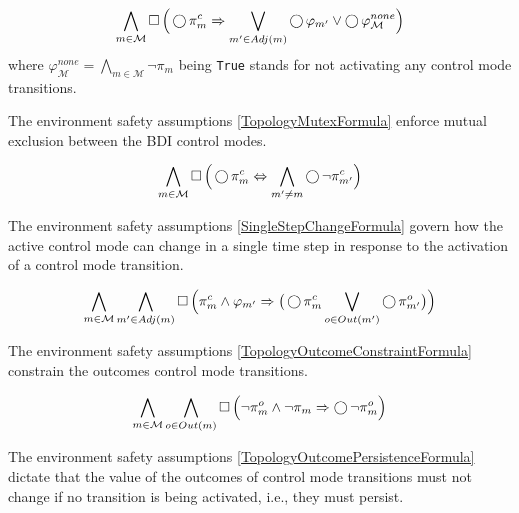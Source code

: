 \begin{equation}\label{TransitionRelationFormula}
	\bigwedge \limits_{m \in \mathcal{M}} \operatorname{\Box} \Big( \operatorname{\bigcirc} \pi_m^c \Rightarrow \bigvee \limits_{m^\prime \in Adj(m)} \operatorname{\bigcirc} \varphi_{m^\prime} \vee \operatorname{\bigcirc} \varphi_\mathcal{M}^{none} \Big)
\end{equation}
where $\varphi_\mathcal{M}^{none} = \bigwedge \limits_{m \in \mathcal{M}} \lnot \pi_m$ being \texttt{True} stands for not activating any control mode transitions.

The environment safety assumptions \eqref{TopologyMutexFormula} enforce mutual exclusion between the BDI control modes.

\begin{equation}\label{TopologyMutexFormula}
	\bigwedge \limits_{m \in \mathcal{M}} \operatorname{\Box} \Big( \operatorname{\bigcirc} \pi_m^c \Leftrightarrow \bigwedge \limits_{m^\prime \neq m} \operatorname{\bigcirc} \lnot \pi_{m^\prime}^c \Big)
\end{equation}

The environment safety assumptions \eqref{SingleStepChangeFormula} govern how the active control mode can change in a single time step in response to the activation of a control mode transition.

\begin{equation}\label{SingleStepChangeFormula}
	\bigwedge \limits_{m \in \mathcal{M}} \bigwedge \limits_{m^\prime \in Adj(m)} \operatorname{\Box} \Big( \pi_m^c \wedge  \varphi_{m^\prime} \Rightarrow \big( \operatorname{\bigcirc} \pi_{m}^c \bigvee \limits_{o \in Out(m^\prime)} \operatorname{\bigcirc} \pi_{m^\prime}^o \big) \Big)
\end{equation}

The environment safety assumptions \eqref{TopologyOutcomeConstraintFormula} constrain the outcomes control mode transitions.

\begin{equation}\label{TopologyOutcomeConstraintFormula}
	\bigwedge \limits_{m \in \mathcal{M}} \bigwedge \limits_{o \in Out(m)} \operatorname{\Box} \Big( \lnot \pi_m^o \wedge \lnot \pi_m \Rightarrow \operatorname{\bigcirc} \lnot \pi_m^o \Big)
\end{equation}

The environment safety assumptions \eqref{TopologyOutcomePersistenceFormula} dictate that the value of the outcomes of control mode transitions must not change if no transition is being activated, i.e., they must persist.

